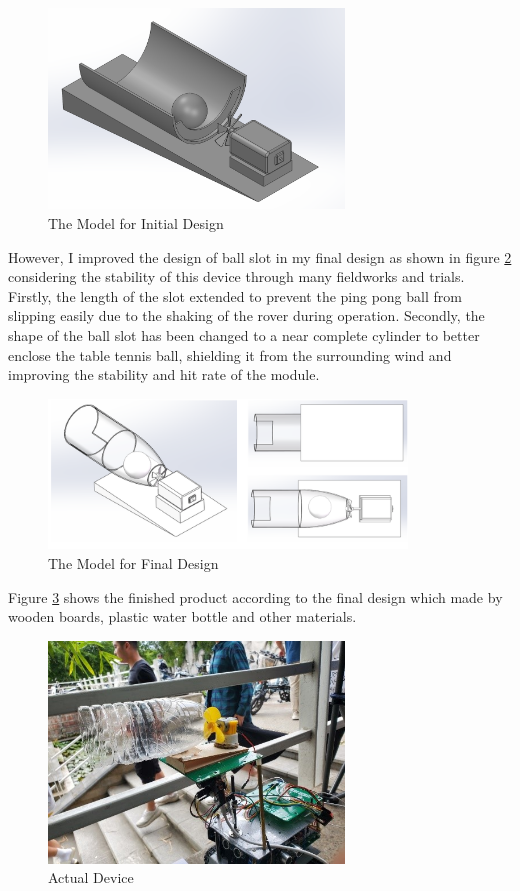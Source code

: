 \documentclass[12pt, a4paper, oneside]{report}
\begin{document}
\begin{figure}[H]
  \centering
  \includegraphics[width=0.7\textwidth]{pic/Table tennis/9.png}
  \caption{The Model for Initial Design}
  \label{fig:tb1}
\end{figure}

However, I improved the design of ball slot in my final design as shown in figure \ref{fig:tb2} considering the stability of this device through many fieldworks and trials. Firstly, the length of the slot extended to prevent the ping pong ball from slipping easily due to the shaking of the rover during operation. Secondly, the shape of the ball slot has been changed to a near complete cylinder to better enclose the table tennis ball, shielding it from the surrounding wind and improving the stability and hit rate of the module.

\begin{figure}[H]
  \centering
  \includegraphics[width=0.85\textwidth]{pic/Table tennis/10.png}
  \caption{The Model for Final Design}
  \label{fig:tb2}
\end{figure}

Figure \ref{fig:tb3} shows the finished product according to the final design which made by wooden boards, plastic water bottle and other materials.

\begin{figure}[H]
  \centering
  \includegraphics[width=0.7\textwidth]{pic/Table tennis/11.jpg}
  \caption{Actual Device}
  \label{fig:tb3}
\end{figure}
\end{document}
